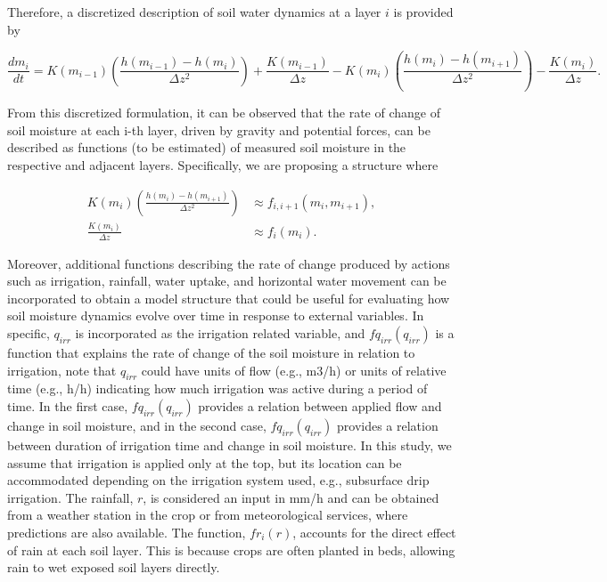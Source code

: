 \documentclass[pdflatex,sn-nature]{sn-jnl}%
\theoremstyle{thmstyleone}%
\theoremstyle{thmstyletwo}%
\theoremstyle{thmstylethree}%
\begin{document}
Therefore, a discretized description of soil water dynamics at a layer $i$ is provided by

\begin{equation}
\frac{d m_i}{d t} = K(m_{i-1})\left(\frac{h(m_{i-1})-h(m_{i})}{\Delta z^2}\right) + \frac{K(m_{i-1})}{\Delta z} - K(m_{i})\left(\frac{h(m_{i})-h(m_{i+1})}{\Delta z^2}\right) - \frac{K(m_{i})}{\Delta z}.
\end{equation}


From this discretized formulation, it can be observed that the rate of change of soil moisture at each i-th layer, driven by gravity and potential forces, can be described as functions (to be estimated) of measured soil moisture in the respective and adjacent layers. Specifically, we are proposing a structure where

\begin{equation}
\begin{aligned}
K(m_{i})\left(\frac{h(m_{i})-h(m_{i+1})}{\Delta z^2}\right) &\approx f_{i,i+1}({m}_i,{m}_{i+1}), \\ 
\frac{K(m_{i})}{\Delta z} &\approx f_i({m}_i).
\end{aligned}
\end{equation}



Moreover, additional functions describing the rate of change produced by actions such as irrigation, rainfall, water uptake, and horizontal water movement can be incorporated to obtain a model structure that could be useful for evaluating how soil moisture dynamics evolve over time in response to external variables. In specific, $q_{irr}$ is incorporated as the irrigation related variable, and $fq_{irr}(q_{irr})$ is a function that explains the rate of change of the soil moisture in relation to irrigation, note that $q_{irr}$ could have units of flow (e.g., \si{m3/h}) or units of relative time (e.g., \si{h/h}) indicating how much irrigation was active during a period of time. In the first case, $fq_{irr}(q_{irr})$ provides a relation between applied flow and change in soil moisture, and in the second case, $fq_{irr}(q_{irr})$  provides a relation between duration of irrigation time and change in soil moisture. In this study, we assume that irrigation is applied only at the top, but its location can be accommodated depending on the irrigation system used, e.g., subsurface drip irrigation. 
The rainfall, $r$, is considered an input in \si{mm/h} and can be obtained from a weather station in the crop or from meteorological services, where predictions are also available. The function, $fr_i(r)$, accounts for the direct effect of rain at each soil layer. This is because crops are often planted in beds, allowing rain to wet exposed soil layers directly.
\end{document}
